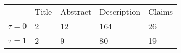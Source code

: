 {

\ttfamily\small

\begin{tabular}{lllll}
\toprule\noalign{\smallskip} 
        & Title & Abstract & Description & Claims\\
\noalign{\smallskip} 
\midrule
\noalign{\smallskip} 

 $\tau=0 $  & 2  & 12 & 164 & 26 \\
\hline
$\tau=1 $    & 2 & 9 & 80 & 19\\
\bottomrule 
\end{tabular}


}
